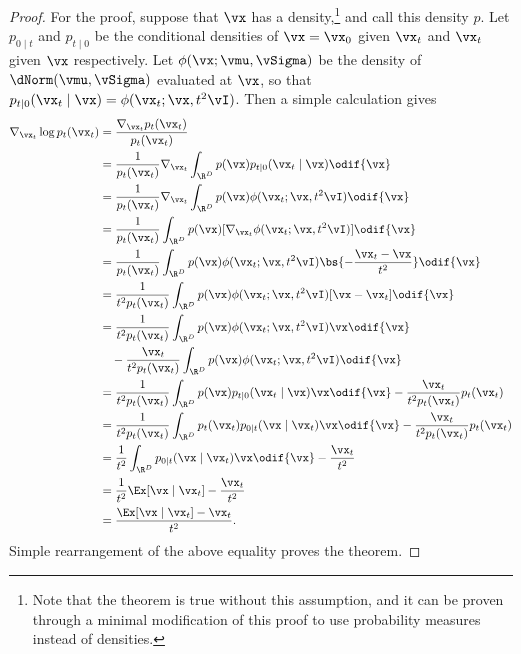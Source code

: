 \documentclass[../../book-main.tex]{subfiles}
\begin{document}
\begin{proof}
    For the proof, suppose that \(\vx\) has a
    density,\footnote{Note that the
        theorem is true without this assumption, and it can be proven through
        a minimal modification of this proof to use probability measures
    instead of densities.} and call this density \(p\). Let
    \(p_{0 \mid t}\) and \(p_{t \mid 0}\) be the conditional densities of \(\vx
    = \vx_{0}\) given \(\vx_{t}\) and \(\vx_{t}\) given \(\vx\) respectively.
    Let \(\phi(\vx ; \vmu, \vSigma)\) be the density of \(\dNorm(\vmu,
    \vSigma)\) evaluated at \(\vx\), so that \(p_{t \mid 0}(\vx_{t} \mid \vx)
    = \phi(\vx_{t} ; \vx, t^{2}\vI)\). Then a simple calculation gives
    \begin{align}
        \nabla_{\vx_{t}} \log p_{t}(\vx_{t})
        &= \frac{\nabla_{\vx_{t}}p_{t}(\vx_{t})}{p_{t}(\vx_{t})} \\
        &=
        \frac{1}{p_{t}(\vx_{t})}\nabla_{\vx_{t}}\int_{\R^{D}}p(\vx)p_{t
        \mid 0}(\vx_{t} \mid \vx)\odif{\vx} \\
        &=
        \frac{1}{p_{t}(\vx_{t})}\nabla_{\vx_{t}}\int_{\R^{D}}p(\vx)\phi(\vx_{t}
        ;\vx, t^{2}\vI)\odif{\vx} \\
        &=
        \frac{1}{p_{t}(\vx_{t})}\int_{\R^{D}}p(\vx)[\nabla_{\vx_{t}}\phi(\vx_{t}
        ;\vx, t^{2}\vI)]\odif{\vx} \\
        &= \frac{1}{p_{t}(\vx_{t})}\int_{\R^{D}}p(\vx)\phi(\vx_{t} ;
        \vx, t^{2}\vI)\bs{-\frac{\vx_{t} - \vx}{t^{2}}}\odif{\vx} \\
        &=
        \frac{1}{t^{2}p_{t}(\vx_{t})}\int_{\R^{D}}p(\vx)\phi(\vx_{t}
        ; \vx, t^{2}\vI)[\vx - \vx_{t}]\odif{\vx} \\
        &= \frac{1}{t^{2}p_{t}(\vx_{t})}\int_{\R^{D}}p(\vx)\phi(\vx_{t} ; \vx,
        t^{2}\vI)\vx \odif{\vx} \\
        & \quad -
        \frac{\vx_{t}}{t^{2}p_{t}(\vx_{t})}\int_{\R^{D}}p(\vx)\phi(\vx_{t}
        ; \vx, t^{2}\vI)\odif{\vx}\nonumber \\
        &= \frac{1}{t^{2}p_{t}(\vx_{t})}\int_{\R^{D}}p(\vx)p_{t \mid
        0}(\vx_{t} \mid \vx)\vx \odif{\vx} -
        \frac{\vx_{t}}{t^{2}p_{t}(\vx_{t})}p_{t}(\vx_{t}) \\
        &=
        \frac{1}{t^{2}p_{t}(\vx_{t})}\int_{\R^{D}}p_{t}(\vx_{t})p_{0
        \mid t}(\vx \mid \vx_{t})\vx \odif{\vx} -
        \frac{\vx_{t}}{t^{2}p_{t}(\vx_{t})}p_{t}(\vx_{t}) \\
        &= \frac{1}{t^{2}}\int_{\R^{D}}p_{0 \mid t}(\vx \mid
        \vx_{t})\vx \odif{\vx} - \frac{\vx_{t}}{t^{2}} \\
        &= \frac{1}{t^{2}}\Ex[\vx \mid \vx_{t}] - \frac{\vx_{t}}{t^{2}} \\
        &= \frac{\Ex[\vx \mid \vx_{t}] - \vx_{t}}{t^{2}}.
    \end{align}
    Simple rearrangement of the above equality proves the theorem.
\end{proof}
\end{document}
